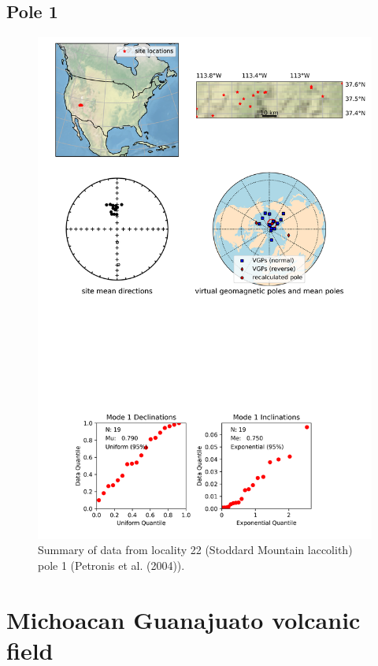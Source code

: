 \documentclass{article}
\begin{document}
\subsection{Pole 1}


\begin{figure}[H]
\centering
\includegraphics[width=5 in]{./22/1/pole_summary.png}
\caption{Summary of data from locality 22 (Stoddard Mountain laccolith) pole 1 (Petronis et al. (2004)).}
\end{figure}

\section{Michoacan Guanajuato volcanic field}
\end{document}
